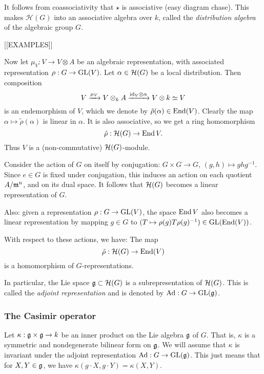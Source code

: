 \documentclass[11pt, english]{article}
\begin{document}
It follows from coassociativity that $\star$ is associative (easy diagram chase). This makes $\mathcal H(G)$ into an associative algebra over $k$, called the \emph{distribution algebra} of the algebraic group $G$. 

[[EXAMPLES]]

Now let $\mu_V: V \to V \otimes A$ be an algebraic representation, with associated representation $\rho:G \to \operatorname{GL}(V)$. Let $\alpha \in \mathcal{H}(G)$ be a local distribution. Then composition
\[
V \xrightarrow{\mu_V} V \otimes_k A \xrightarrow{\text{id}_V \otimes \alpha} V \otimes k \simeq V
\]
is an endemorphism of $V$, which we denote by $\tilde \rho(\alpha)\in \operatorname{End}(V)$. Clearly the map $\alpha \mapsto \tilde \rho (\alpha)$ is linear in $\alpha$. It is also associative, so we get a ring homomorphism
\begin{equation}
\tilde \rho: \mathcal{H}(G) \to \operatorname{End} V.
\end{equation}
Thus $V$ is a (non-commutative) $\mathcal{H}(G)$-module.

Consider the action of $G$ on itself by conjugation: $G \times G \to G$, $(g,h) \mapsto  ghg^{-1}$. Since $e \in G$ is fixed under conjugation, this induces an action on each quotient $A/\mathfrak{m}^n$, and on its dual space. It follows that $\mathcal{H}(G)$ becomes a linear representation of $G$.

Also: given a representation $\rho:G \to \operatorname{GL}(V)$, the space $\operatorname{End} V$ also becomes a linear representation by mapping $g \in G$ to $(T \mapsto \rho(g) T \rho(g)^{-1}) \in \operatorname{GL}(\operatorname{End}(V))$. 

\begin{lemma}
With respect to these actions, we have: The map
$$
\tilde \rho : \mathcal{H}(G) \to \operatorname{End}(V)
$$
is a homomorphism of $G$-representations.
\end{lemma}

In particular, the Lie space $\mathfrak g \subset \mathcal{H}(G)$ is a subrepresentation of $\mathcal{H}(G)$. This is called the \emph{adjoint representation} and is denoted by $\mathrm{Ad}:G \to \operatorname{GL}(\mathfrak g)$.


\subsubsection{The Casimir operator}

Let $\kappa: \mathfrak g \times \mathfrak g \to k$ be an inner product on the Lie algebra $\mathfrak g$ of $G$. That is, $\kappa$ is a symmetric and nondegenerate bilinear form on $\mathfrak g$. We will assume that $\kappa$ is invariant under the adjoint representation $\mathrm{Ad}: G \to \operatorname{GL}(\mathfrak g)$. This just means that for $X,Y \in \mathfrak g$, we have $\kappa(g \cdot X,g \cdot Y)=\kappa(X,Y)$. 
\end{document}
